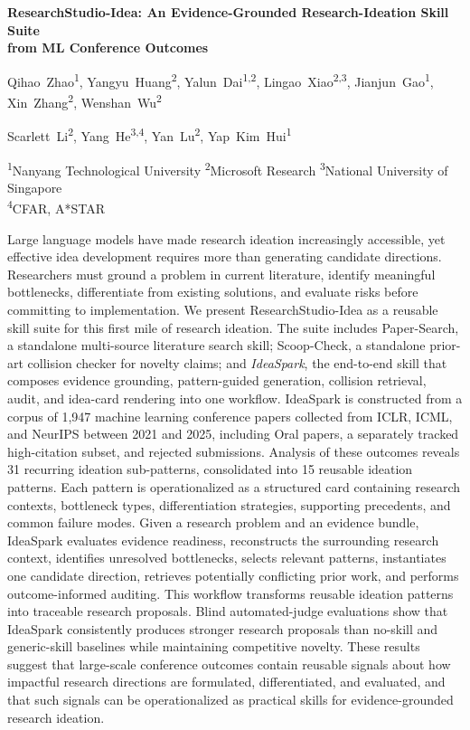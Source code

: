 \documentclass[10pt,a4paper]{article}
\title{\textbf{\reporttitle}}
\author{\reportauthors}
\date{\reportaffiliations}
\newcommand{\ideaword}{\textcolor{msred}{I}\textcolor{msgreen}{d}\textcolor{msblue}{e}\textcolor{msyellow}{a}}
\newcommand{\corrauthmark}{\textsuperscript{\ddag}}
\newcommand{\authorunit}[3]{\mbox{#1\textsuperscript{#2}#3}}
\newcommand{\reporttitle}{ResearchStudio-\ideaword: An Evidence-Grounded Research-Ideation Skill Suite\\from ML Conference Outcomes}
\newcommand{\reportauthorslineone}{\authorunit{Qihao~Zhao}{1}{}, \authorunit{Yangyu~Huang}{2}{\corrauthmark}, \authorunit{Yalun~Dai}{1,2}{}, \authorunit{Lingao~Xiao}{2,3}{}, \authorunit{Jianjun~Gao}{1}{}, \authorunit{Xin~Zhang}{2}{}, \authorunit{Wenshan~Wu}{2}{}}
\newcommand{\reportauthorslinetwo}{\authorunit{Scarlett~Li}{2}{}, \authorunit{Yang~He}{3,4}{}, \authorunit{Yan~Lu}{2}{}, \authorunit{Yap~Kim~Hui}{1}{\corrauthmark}}
\newcommand{\reportaffiliations}{\color{black!55}\textsuperscript{1}Nanyang Technological University \quad \color{black!55}\textsuperscript{2}Microsoft Research \quad \color{black!55}\textsuperscript{3}National University of Singapore\\[-1pt]\color{black!55}\textsuperscript{4}CFAR, A*STAR}
\begin{document}
\begin{center}
{\large\bfseries \reporttitle\par}
\vspace{8pt}
{\normalsize \reportauthorslineone\par}
{\normalsize \reportauthorslinetwo\par}
\vspace{4pt}
{\small \reportaffiliations\par}
\end{center}

\begin{mdframed}[backgroundcolor=abstractbg,
                 linewidth=0pt,
                 roundcorner=12pt,
                 leftmargin=12pt,
                 rightmargin=12pt,
                 innerleftmargin=16pt,
                 innerrightmargin=16pt,
                 innertopmargin=12pt,
                 innerbottommargin=12pt,
                 skipabove=6pt,
                 skipbelow=6pt]
\hypersetup{urlcolor=abstractlink}
Large language models have made research ideation increasingly accessible, yet effective idea development requires more than generating candidate directions. Researchers must ground a problem in current literature, identify meaningful bottlenecks, differentiate from existing solutions, and evaluate risks before committing to implementation. We present ResearchStudio-Idea as a reusable skill suite for this first mile of research ideation. The suite includes Paper-Search, a standalone multi-source literature search skill; Scoop-Check, a standalone prior-art collision checker for novelty claims; and \emph{IdeaSpark}, the end-to-end skill that composes evidence grounding, pattern-guided generation, collision retrieval, audit, and idea-card rendering into one workflow. IdeaSpark is constructed from a corpus of 1{,}947 machine learning conference papers collected from ICLR, ICML, and NeurIPS between 2021 and 2025, including Oral papers, a separately tracked high-citation subset, and rejected submissions. Analysis of these outcomes reveals 31 recurring ideation sub-patterns, consolidated into 15 reusable ideation patterns. Each pattern is operationalized as a structured card containing research contexts, bottleneck types, differentiation strategies, supporting precedents, and common failure modes. Given a research problem and an evidence bundle, IdeaSpark evaluates evidence readiness, reconstructs the surrounding research context, identifies unresolved bottlenecks, selects relevant patterns, instantiates one candidate direction, retrieves potentially conflicting prior work, and performs outcome-informed auditing. This workflow transforms reusable ideation patterns into traceable research proposals. Blind automated-judge evaluations show that IdeaSpark consistently produces stronger research proposals than no-skill and generic-skill baselines while maintaining competitive novelty. These results suggest that large-scale conference outcomes contain reusable signals about how impactful research directions are formulated, differentiated, and evaluated, and that such signals can be operationalized as practical skills for evidence-grounded research ideation.


\end{mdframed}
\end{document}
